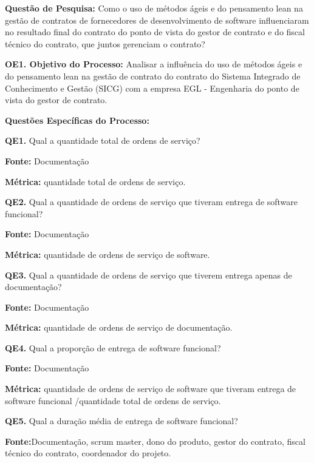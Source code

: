 \textbf{Questão de Pesquisa:} Como o uso de métodos ágeis e do pensamento lean na gestão de contratos de fornecedores de desenvolvimento de software influenciaram no resultado final do contrato do ponto de vista do gestor de contrato e do fiscal técnico do contrato, que juntos gerenciam o contrato?


\textbf{OE1. Objetivo do Processo:} Analisar a influência do uso de métodos ágeis e do pensamento lean na gestão de contrato do contrato do Sistema Integrado de Conhecimento e Gestão (SICG) com a empresa EGL - Engenharia do ponto de vista do gestor de contrato.

\textbf{Questões Específicas do Processo:}


\textbf{QE1.}  Qual a quantidade total de ordens de serviço?

\textbf{Fonte:} Documentação

\textbf{Métrica:} quantidade total de ordens de serviço.
 
\vspace{\onelineskip} 

\textbf{QE2.} Qual a quantidade de ordens de serviço que tiveram entrega de software funcional?

\textbf{Fonte:} Documentação

\textbf{Métrica:} quantidade de ordens de serviço de software.
 
 \vspace{\onelineskip} 

\textbf{QE3.} Qual a quantidade de ordens de serviço que tiverem entrega apenas de documentação?

\textbf{Fonte:} Documentação

\textbf{Métrica:} quantidade de ordens de serviço de documentação.

 \vspace{\onelineskip} 
 
\textbf{QE4.} Qual a proporção de entrega de software funcional?

\textbf{Fonte:} Documentação

\textbf{Métrica:} quantidade de ordens de serviço de software que tiveram entrega de software funcional /quantidade total de ordens de serviço.

 \vspace{\onelineskip} 

\textbf{QE5.} Qual a duração média de entrega de software funcional?

\textbf{Fonte:}Documentação, scrum master, dono do produto, gestor do contrato, fiscal técnico do contrato, coordenador do projeto.

